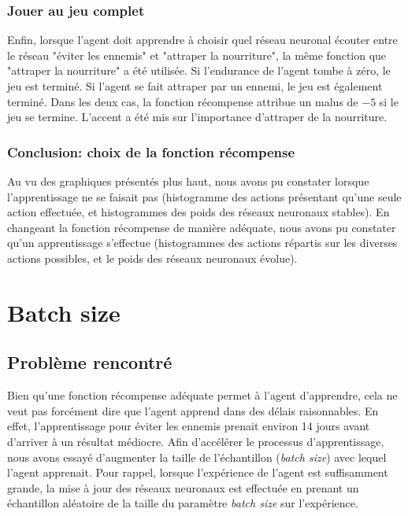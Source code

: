 \documentclass[11pt,a4paper]{report}
\begin{document}
   \newpage
   \subsubsection{Jouer au jeu complet}
   
   \par Enfin, lorsque l'agent doit apprendre à choisir quel réseau neuronal écouter entre le réseau "éviter les ennemis" et "attraper la nourriture", la même fonction que "attraper la nourriture" a été utilisée. Si l'endurance de l'agent tombe à zéro, le jeu est terminé. Si l'agent se fait attraper par un ennemi, le jeu est également terminé. Dans les deux cas, la fonction récompense attribue un malus de $-5$ si le jeu se termine. L'accent a été mis sur l'importance d'attraper de la nourriture.

  \subsubsection{Conclusion: choix de la fonction récompense}   
  
  \par Au vu des graphiques présentés plus haut, nous avons pu constater lorsque l'apprentissage ne se faisait pas (histogramme des actions présentant qu'une seule action effectuée, et histogrammes des poids des réseaux neuronaux stables). En changeant la fonction récompense de manière adéquate, nous avons pu constater qu'un apprentissage s'effectue (histogrammes des actions répartis sur les diverses actions possibles, et le poids des réseaux neuronaux évolue). 
   
   \newpage
   \section{Batch size}
   
   \subsection{Problème rencontré}
   
   \par Bien qu'une fonction récompense adéquate permet à l'agent d'apprendre, cela ne veut pas forcément dire que l'agent apprend dans des délais raisonnables. En effet, l'apprentissage pour éviter les ennemis prenait environ 14 jours avant d'arriver à un résultat médiocre. Afin d'accélérer le processus d'apprentissage, nous avons essayé d'augmenter la taille de l'échantillon (\textit{batch size}) avec lequel l'agent apprenait. Pour rappel, lorsque l’expérience de l'agent est suffisamment grande, la mise à jour des réseaux neuronaux est effectuée en prenant un échantillon aléatoire de la taille du paramètre \textit{batch size} sur l'expérience. 
   
\end{document}
